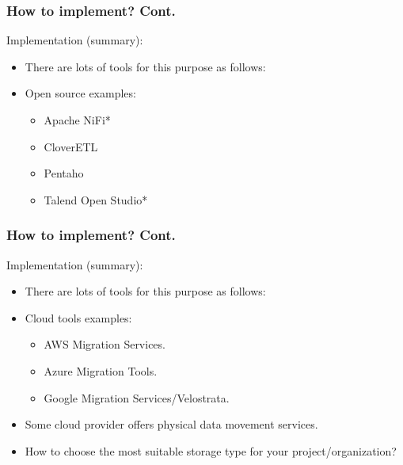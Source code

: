 
\begin{frame}
\frametitle{How to implement? Cont.}
\begin{wideitemize}
	\item Implementation (summary):
	\begin{itemize}[<+->]
		\item There are lots of tools for this purpose as follows:
		\item Open source examples:
		\begin{itemize}
			\item Apache NiFi*
			\item CloverETL
			\item Pentaho
			\item Talend Open Studio*
		\end{itemize}			
	\end{itemize}
\end{wideitemize}
\end{frame}


\begin{frame}
\frametitle{How to implement? Cont.}
\begin{wideitemize}
	\item Implementation (summary):
	\begin{itemize}[<+->]
		\item There are lots of tools for this purpose as follows:
		\item Cloud tools examples:
		\begin{itemize}
			\item AWS Migration Services.
			\item Azure Migration Tools.
			\item Google Migration Services/Velostrata.
		\end{itemize}			
		\item Some cloud provider offers physical data movement services.
		\item How to choose the most suitable storage type for your project/organization?
	\end{itemize}
\end{wideitemize}
\end{frame}


